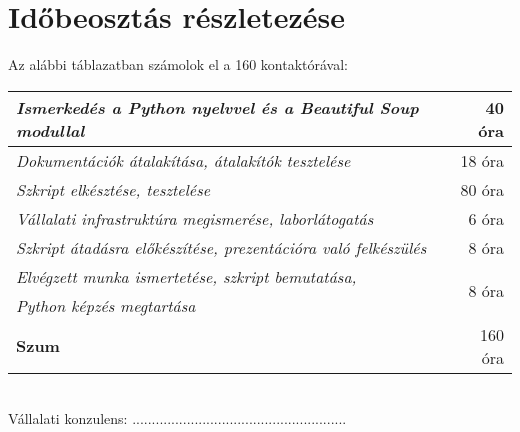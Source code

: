 \documentclass[a4paper,oneside,12pt]{article}
\begin{document}
\section{Időbeosztás részletezése}
Az alábbi táblazatban számolok el a 160 kontaktórával:
%
\begin{table}[h!]
\centering
    \begin{tabular}{l|r}
        \emph{Ismerkedés a Python nyelvvel és a Beautiful Soup modullal} & 40 óra \\ \hline
		\emph{Dokumentációk átalakítása, átalakítók tesztelése}& 18 óra \\ \hline
		\emph{Szkript elkésztése, tesztelése} & 80 óra \\ \hline
		\emph{Vállalati infrastruktúra megismerése, laborlátogatás} & 6 óra  \\ \hline
		\emph{Szkript átadásra előkészítése, prezentációra való felkészülés} & 8 óra \\ \hline
		\emph{Elvégzett munka ismertetése, szkript bemutatása,} & \multirow{2}{*}{8 óra} \\ 
					\emph{Python képzés megtartása} \\ \hline \hline
		\textbf{Szum} & 160 óra \\ \hline
    \end{tabular}
\end{table}
\\[40pt] Vállalati konzulens: \hfill .......................................................
\end{document}
